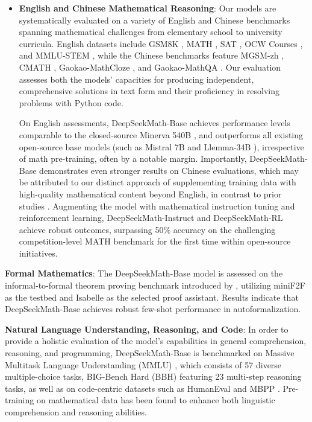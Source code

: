 \begin{itemize}[topsep=0pt]
    \item \textbf{English and Chinese Mathematical Reasoning}: Our models are systematically evaluated on a variety of English and Chinese benchmarks spanning mathematical challenges from elementary school to university curricula. English datasets include GSM8K \citep{gsm8k}, MATH \citep{MATH}, SAT \citep{llemma}, OCW Courses \citep{minerva}, and MMLU-STEM \citep{mmlu}, while the Chinese benchmarks feature MGSM-zh \citep{mgsm}, CMATH \citep{wei2023cmath}, Gaokao-MathCloze \citep{agieval}, and Gaokao-MathQA \citep{agieval}. Our evaluation assesses both the models' capacities for producing independent, comprehensive solutions in text form and their proficiency in resolving problems with Python code.

    On English assessments, DeepSeekMath-Base achieves performance levels comparable to the closed-source Minerva 540B \citep{minerva}, and outperforms all existing open-source base models (such as Mistral 7B \citep{mistral} and Llemma-34B \citep{llemma}), irrespective of math pre-training, often by a notable margin. Importantly, DeepSeekMath-Base demonstrates even stronger results on Chinese evaluations, which may be attributed to our distinct approach of supplementing training data with high-quality mathematical content beyond English, in contrast to prior studies \citep{minerva,llemma}. Augmenting the model with mathematical instruction tuning and reinforcement learning, DeepSeekMath-Instruct and DeepSeekMath-RL achieve robust outcomes, surpassing 50\% accuracy on the challenging competition-level MATH benchmark for the first time within open-source initiatives.
\end{itemize}

\item \textbf{Formal Mathematics}: The DeepSeekMath-Base model is assessed on the informal-to-formal theorem proving benchmark introduced by \citep{dsp_proof}, utilizing miniF2F \citep{minif2f} as the testbed and Isabelle \citep{isabelle} as the selected proof assistant. Results indicate that DeepSeekMath-Base achieves robust few-shot performance in autoformalization.
\item \textbf{Natural Language Understanding, Reasoning, and Code}: In order to provide a holistic evaluation of the model’s capabilities in general comprehension, reasoning, and programming, DeepSeekMath-Base is benchmarked on Massive Multitask Language Understanding (MMLU) \citep{mmlu}, which consists of 57 diverse multiple-choice tasks, BIG-Bench Hard (BBH) \citep{bbh} featuring 23 multi-step reasoning tasks, as well as on code-centric datasets such as HumanEval \citep{codex} and MBPP \citep{mbpp}. Pre-training on mathematical data has been found to enhance both linguistic comprehension and reasoning abilities.

